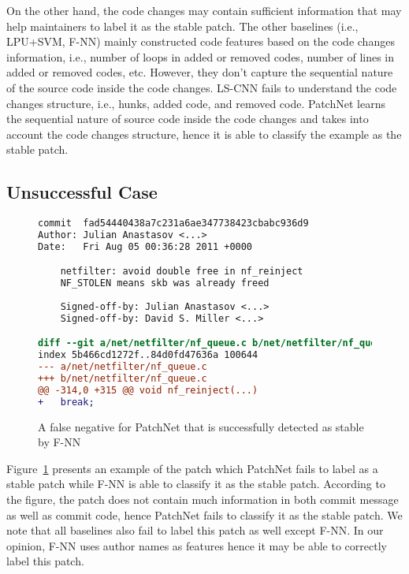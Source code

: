 On the other hand, the code changes may contain sufficient information that may help maintainers to label it as the stable patch. The other baselines (i.e., LPU+SVM, F-NN) mainly constructed code features based on the code changes information, i.e., number of loops in added or removed codes, number of lines in added or removed codes, etc. However, they don't capture the sequential nature of the source code inside the code changes. LS-CNN fails to understand the code changes structure, i.e., hunks, added code, and removed code. PatchNet learns the sequential nature of source code inside the code changes and takes into account the code changes structure, hence it is able to classify the example as the stable patch.  

\subsection{Unsuccessful Case}
\label{sec:fail_case}

\begin{figure}[t!]
\begin{lstlisting}[language=diff]
commit 	fad54440438a7c231a6ae347738423cbabc936d9
Author: Julian Anastasov <...>
Date:   Fri Aug 05 00:36:28 2011 +0000

    netfilter: avoid double free in nf_reinject
    NF_STOLEN means skb was already freed
    
    Signed-off-by: Julian Anastasov <...>
    Signed-off-by: David S. Miller <...>

diff --git a/net/netfilter/nf_queue.c b/net/netfilter/nf_queue.c
index 5b466cd1272f..84d0fd47636a 100644
--- a/net/netfilter/nf_queue.c
+++ b/net/netfilter/nf_queue.c
@@ -314,0 +315 @@ void nf_reinject(...)
+	break;
\end{lstlisting}\vspace{-0.4cm}
\caption{A false negative for PatchNet that is successfully detected as
  stable by F-NN}
\label{fig:bad_case}\vspace{-0.4cm}
\end{figure}

Figure~\ref{fig:bad_case} presents an example of the patch which PatchNet fails to label as a stable patch while F-NN is able to classify it as the stable patch. According to the figure, the patch does not contain much information in both commit message as well as commit code, hence PatchNet fails to classify it as the stable patch. We note that all baselines also fail to label this patch as well except F-NN. In our opinion, F-NN uses author names as features hence it may be able to correctly label this patch. 
